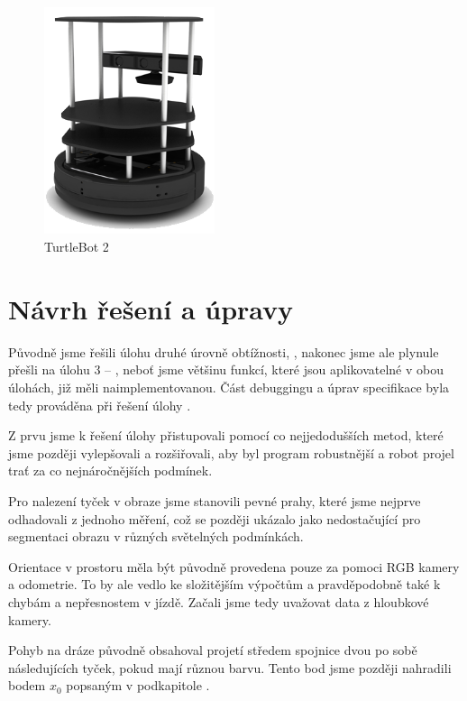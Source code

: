 \documentclass{article}
\begin{document}
\begin{figure}[h]
	\centering
	\includegraphics[width=5cm]{turtlebot_2.png}
	\caption{TurtleBot 2}
\end{figure}
	

\clearpage


\section{Návrh řešení a úpravy}

	Původně jsme řešili úlohu druhé úrovně obtížnosti, , nakonec jsme ale plynule přešli na úlohu 3 -- , neboť jsme většinu funkcí, které jsou aplikovatelné v obou úlohách, již měli naimplementovanou. Část debuggingu a úprav specifikace byla tedy prováděna při řešení úlohy . 

	Z prvu jsme k řešení úlohy přistupovali pomocí co nejjedodušších metod, které jsme později vylepšovali a rozšiřovali, aby byl program robustnější a robot projel trať za co nejnáročnějších podmínek. 
	
	Pro nalezení tyček v obraze jsme stanovili pevné prahy, které jsme nejprve odhadovali z jednoho měření, což se později ukázalo jako nedostačující pro segmentaci obrazu v různých světelných podmínkách. 
	
	Orientace v prostoru měla být původně provedena pouze za pomoci RGB kamery a odometrie. To by ale vedlo ke složitějším výpočtům a pravděpodobně také k chybám a nepřesnostem v jízdě. Začali jsme tedy uvažovat data z hloubkové kamery. 
	
	Pohyb na dráze původně obsahoval projetí středem spojnice dvou po sobě následujících tyček, pokud mají různou barvu. Tento bod jsme později nahradili bodem $x_{0}$ popsaným v podkapitole . 

	
	
\end{document}
